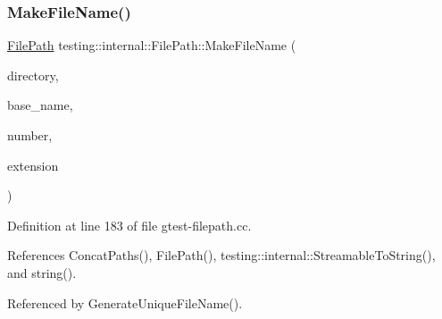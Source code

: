 \subsubsection{\texorpdfstring{Make\+File\+Name()}{MakeFileName()}}
{\footnotesize\ttfamily \hyperlink{classtesting_1_1internal_1_1FilePath}{File\+Path} testing\+::internal\+::\+File\+Path\+::\+Make\+File\+Name (\begin{DoxyParamCaption}\item[{const \hyperlink{classtesting_1_1internal_1_1FilePath}{File\+Path} \&}]{directory,  }\item[{const \hyperlink{classtesting_1_1internal_1_1FilePath}{File\+Path} \&}]{base\+\_\+name,  }\item[{int}]{number,  }\item[{const char $\ast$}]{extension }\end{DoxyParamCaption})\hspace{0.3cm}{\ttfamily [static]}}



Definition at line 183 of file gtest-\/filepath.\+cc.



References Concat\+Paths(), File\+Path(), testing\+::internal\+::\+Streamable\+To\+String(), and string().



Referenced by Generate\+Unique\+File\+Name().



